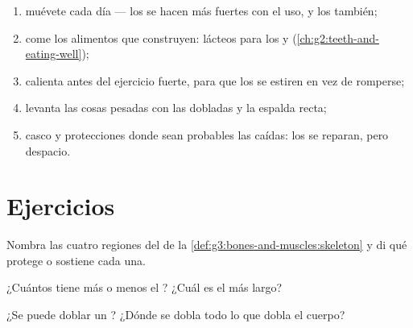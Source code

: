\begin{method}\label{met:g3:bones-and-muscles:care}
\begin{enumerate}
  \item muévete cada día --- los  se hacen más fuertes con el
        uso, y los  también;
  \item come los alimentos que construyen: lácteos para los  y
         (\cref{ch:g2:teeth-and-eating-well});
  \item calienta antes del ejercicio fuerte, para que los  se
        estiren en vez de romperse;
  \item levanta las cosas pesadas con las  dobladas y la
        espalda recta;
  \item casco y protecciones donde sean probables las caídas: los
         se reparan, pero despacio.
\end{enumerate}
\end{method}

\section{Ejercicios}

\begin{exercise}[$\star$]\label{exo:g3:bones-and-muscles:1}
Nombra las cuatro regiones del  de la
\cref{def:g3:bones-and-muscles:skeleton} y di qué protege o sostiene
cada una.
\end{exercise}

\begin{exercise}[$\star$]\label{exo:g3:bones-and-muscles:2}
¿Cuántos  tiene más o menos el ? ¿Cuál es el más largo?
\end{exercise}

\begin{exercise}[$\star$]\label{exo:g3:bones-and-muscles:3}
¿Se puede doblar un ? ¿Dónde se dobla todo lo que dobla el cuerpo?
\end{exercise}

